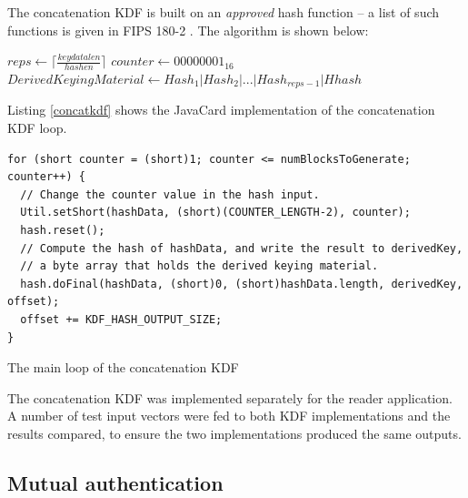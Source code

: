 \documentclass[12pt,a4paper,twoside,openright]{report}
\begin{document}
The concatenation KDF is built on an \emph{approved} hash function -- a list of such functions is given in FIPS 180-2 \cite{fips1802}. The algorithm is shown below:

\begin{center}
\begin{algorithm}[H]
\SetAlgoLined
{}
$reps \leftarrow \lceil \frac{keydatalen}{hashen} \rceil$\;
$counter \leftarrow 00000001_{16}$\;
$DerivedKeyingMaterial \leftarrow Hash_1 \vert Hash_2 \vert ... \vert Hash_{reps-1} \vert Hhash$\;
\end{algorithm}
\end{center}

\noindent
Listing \autoref{concatkdf} shows the JavaCard implementation of the concatenation KDF loop.

\begin{listing}
\begin{verbatim}
for (short counter = (short)1; counter <= numBlocksToGenerate; counter++) {
  // Change the counter value in the hash input.
  Util.setShort(hashData, (short)(COUNTER_LENGTH-2), counter);
  hash.reset();
  // Compute the hash of hashData, and write the result to derivedKey,
  // a byte array that holds the derived keying material.
  hash.doFinal(hashData, (short)0, (short)hashData.length, derivedKey, offset);
  offset += KDF_HASH_OUTPUT_SIZE;
}
\end{verbatim}
\caption{The main loop of the concatenation KDF}
\label{concatkdf}
\end{listing}

\noindent
The concatenation KDF was implemented separately for the reader application. A number of test input vectors were fed to both KDF implementations and the results compared, to ensure the two implementations produced the same outputs.

\subsection{Mutual authentication}
\label{sec:mutualauth}
\end{document}

